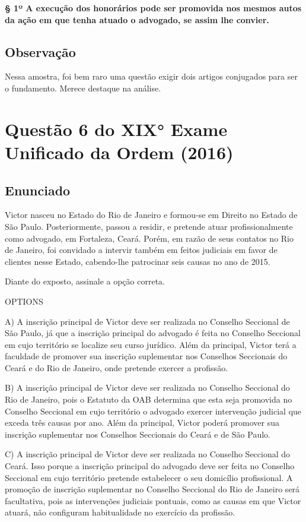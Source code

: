 \documentclass[12pt]{article}
\begin{document}
\textbf{§ 1º A execução dos honorários pode ser promovida nos mesmos autos da ação em que tenha atuado o advogado, se assim lhe convier.}


\subsection{Observação}

Nessa amostra, foi bem raro uma questão exigir dois artigos conjugados para ser o fundamento. Merece destaque na análise.


\section{Questão 6 do XIX° Exame Unificado da Ordem (2016)}

\subsection{Enunciado}

Victor nasceu no Estado do Rio de Janeiro e formou-se em 
Direito no Estado de São Paulo. Posteriormente, passou a 
residir, e pretende atuar profissionalmente como advogado, 
em Fortaleza, Ceará. Porém, em razão de seus contatos no Rio 
de Janeiro, foi convidado a intervir também em feitos judiciais 
em favor de clientes nesse Estado, cabendo-lhe patrocinar seis 
causas no ano de 2015.  
 
Diante do exposto, assinale a opção correta. 
 
OPTIONS

A) A inscrição principal de Victor deve ser realizada no 
Conselho Seccional de São Paulo, já que a inscrição 
principal do advogado é feita no Conselho Seccional em 
cujo território se localize seu curso jurídico. Além da 
principal, Victor terá a faculdade de promover sua 
inscrição suplementar nos Conselhos Seccionais do Ceará e 
do Rio de Janeiro, onde pretende exercer a profissão. 

B) A inscrição principal de Victor deve ser realizada no 
Conselho Seccional do Rio de Janeiro, pois o Estatuto da 
OAB determina que esta seja promovida no Conselho 
Seccional em cujo território o advogado exercer 
intervenção judicial que exceda três causas por ano. Além 
da principal, Victor poderá promover sua inscrição 
suplementar nos Conselhos Seccionais do Ceará e de São 
Paulo. 

C) A inscrição principal de Victor deve ser realizada no 
Conselho Seccional do Ceará. Isso porque a inscrição 
principal do advogado deve ser feita no Conselho Seccional 
em cujo território pretende estabelecer o seu domicílio 
profissional. A promoção de inscrição suplementar no 
Conselho Seccional do Rio de Janeiro será facultativa, pois 
as intervenções judiciais pontuais, como as causas em que 
Victor atuará, não configuram habitualidade no exercício 
da profissão. 
\end{document}
